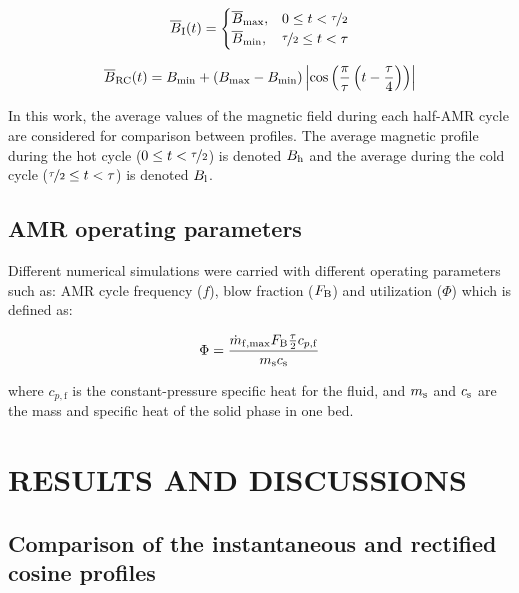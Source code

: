 \documentclass[draft]{svjour3}
\newcommand{\bmax}{\ensuremath{{B}\ped{max}}}
\newcommand{\bmin}{\ensuremath{{B}\ped{min}}}
\begin{document}
\begin{equation}
\overline{B}_{\mathrm{I}}(t)=
\begin{cases}
\overline{B}_{\mathrm{max}}, & 0 \le t < \nicefrac{\tau}{2} \\
\overline{B}_{\mathrm{min}}, & \nicefrac{\tau}{2} \le t < \tau\\
\end{cases}
\label{eq:4}
\end{equation}

\begin{equation}
\average{B}\ped{RC}(t) = \bmin + \left(\bmax - \bmin\right)  \left\lvert \cos\left( \frac{\pi}{\tau} \left( t - \frac{\tau}{4}\right)\right) \right\rvert
\label{eq:5}
\end{equation}


In this work, the average values of the magnetic field during each half-AMR cycle are considered for comparison between profiles. The average magnetic profile during the hot cycle ($0 \le t < \nicefrac{\tau}{2}$) is denoted $B_{\mathrm{h}}$ and the average during the cold cycle  ($ \nicefrac{\tau}{2} \le t < \tau$) is denoted $B_{\mathrm{l}}$.

\subsection{AMR operating parameters}
\label{sec:amr-oper-param}


Different numerical simulations were carried with different operating parameters such as: AMR cycle frequency ($f$), blow fraction ($F_{\mathrm{B}}$) and utilization ($\Phi$) which is defined as:

\begin{equation}
\Phi = \frac{\dot{m}_{\mathrm{f,max}}F_{\mathrm{B}}\frac{\tau}{2}c_{p,\mathrm{f}}}{m_{\mathrm{s}} c_{\mathrm{s}}}
\label{eq:2}
\end{equation}

\noindent where $c_{p,\mathrm{f}}$ is the constant-pressure specific heat for the fluid, and $m_{\mathrm{s}}$ and $c_{\mathrm{s}}$ are the mass and specific heat of the solid phase in one bed. 

\section{RESULTS AND DISCUSSIONS}
\label{sec:results-discussions}

\subsection{Comparison of the instantaneous and rectified cosine profiles}
\label{sec:comp-inst-cosine}
\end{document}
